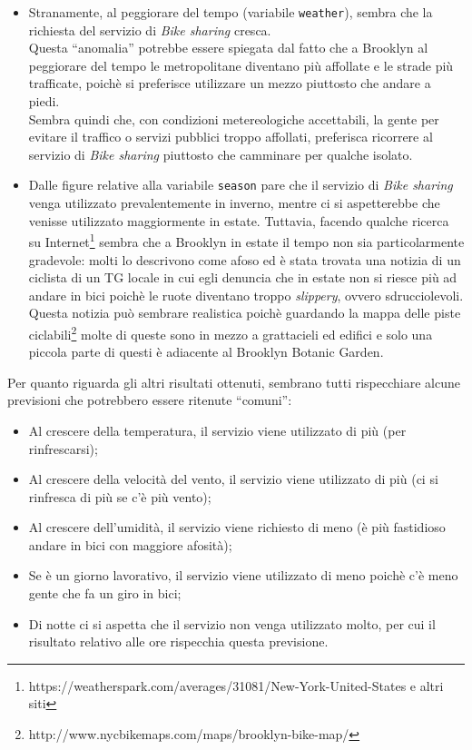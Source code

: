 \begin{itemize}
\item Stranamente, al peggiorare del tempo (variabile \texttt{weather}),
  sembra che la richiesta del servizio di \emph{Bike sharing} cresca. \\
  Questa ``anomalia'' potrebbe essere spiegata dal fatto che a Brooklyn al
  peggiorare del tempo le metropolitane diventano più affollate e le strade
  più trafficate, poichè si preferisce utilizzare un mezzo piuttosto che
  andare a piedi. \\
  Sembra quindi che, con condizioni metereologiche accettabili, la gente per
  evitare il traffico o servizi pubblici troppo affollati, preferisca
  ricorrere al servizio di \emph{Bike sharing} piuttosto che camminare per
  qualche isolato.
\item Dalle figure relative alla variabile \texttt{season} pare che il
  servizio di \emph{Bike sharing} venga utilizzato prevalentemente in inverno,
  mentre ci si aspetterebbe che venisse utilizzato maggiormente in estate.
  Tuttavia, facendo qualche ricerca su Internet\footnote{
  https://weatherspark.com/averages/31081/New-York-United-States e altri siti}
  sembra che a Brooklyn in estate il tempo non sia particolarmente gradevole:
  molti lo descrivono come afoso ed è stata trovata una notizia di un ciclista
  di un TG locale in cui egli denuncia che in estate non si riesce più ad
  andare in bici poichè le ruote diventano troppo \emph{slippery}, ovvero
  sdrucciolevoli. \\
  Questa notizia può sembrare realistica poichè guardando la mappa delle piste
  ciclabili\footnote{http://www.nycbikemaps.com/maps/brooklyn-bike-map/} molte
  di queste sono in mezzo a grattacieli ed edifici e solo una piccola parte di
  questi è adiacente al Brooklyn Botanic Garden.
\end{itemize}

Per quanto riguarda gli altri risultati ottenuti, sembrano tutti rispecchiare
alcune previsioni che potrebbero essere ritenute ``comuni'':

\begin{itemize}
\item Al crescere della temperatura, il servizio viene utilizzato di più (per
  rinfrescarsi);
\item Al crescere della velocità del vento, il servizio viene utilizzato di
  più (ci si rinfresca di più se c'è più vento);
\item Al crescere dell'umidità, il servizio viene richiesto di meno (è più
  fastidioso andare in bici con maggiore afosità);
\item Se è un giorno lavorativo, il servizio viene utilizzato di meno poichè
  c'è meno gente che fa un giro in bici;
\item Di notte ci si aspetta che il servizio non venga utilizzato molto, per
  cui il risultato relativo alle ore rispecchia questa previsione.
\end{itemize}
